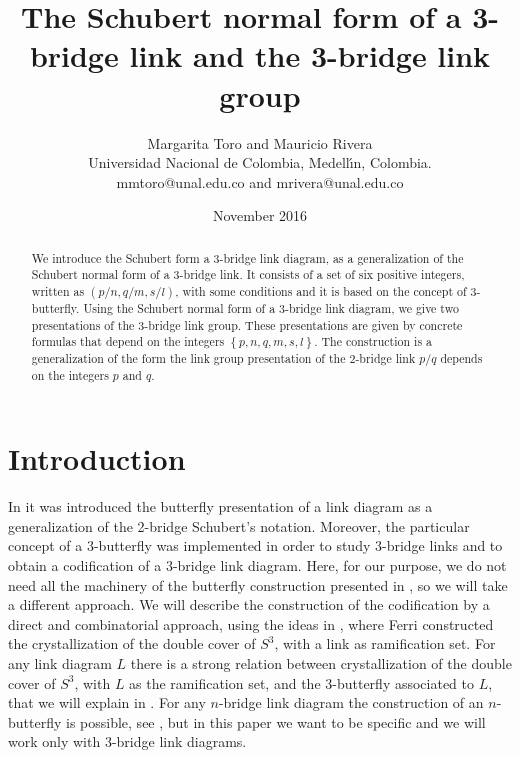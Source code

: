 \documentclass[12pt]{article}%
\begin{document}
\title{The Schubert normal form of a 3-bridge link and the 3-bridge link group}
\author{Margarita Toro and Mauricio Rivera\\Universidad Nacional de Colombia, Medell\'{\i}n, Colombia.\\mmtoro@unal.edu.co and mrivera@unal.edu.co}
\date{November 2016}
\maketitle

\begin{abstract}
We introduce the Schubert form a $3$-bridge link diagram, as a generalization
of the Schubert normal form of a $3$-bridge link. It consists of a set of six
positive integers, written as $\left(  p/n,q/m,s/l\right)  $, with some
conditions and it is based on the concept of $3$-butterfly. Using the Schubert
normal form of a $3$-bridge link diagram, we give two presentations of the
3-bridge link group. These presentations are given by concrete formulas that
depend on the integers $\left\{  p,n,q,m,s,l\right\}  .$ The construction is a
generalization of the form the link group presentation of the $2$-bridge link
$p/q$ depends on the integers $p$ and $q$.

\end{abstract}

\section{Introduction}

In \cite{HMTT4} it was introduced the butterfly presentation of a link diagram
as a generalization of the 2-bridge Schubert's notation. Moreover, the
particular concept of a $3$-butterfly was implemented in order to study
$3$-bridge links and to obtain a codification of a $3$-bridge link diagram.
Here, for our purpose, we do not need all the machinery of the butterfly
construction presented in \cite{HMTT1}, so we will take a different approach.
We will describe the construction of the codification by a direct and
combinatorial approach, using the ideas in \cite{Fe}, where Ferri constructed
the crystallization of the double cover of $S^{3}$, with a link as
ramification set. For any link diagram $L$ there is a strong relation between
crystallization of the double cover of $S^{3}$, with $L$ as the ramification
set, and the $3$-butterfly associated to $L$, that we will explain in
\cite{RiTo}. For any $n$-bridge link diagram the construction of an
$n$-butterfly is possible, see \cite{HMTT1}, but in this paper we want to be
specific and we will work only with $3$-bridge link diagrams.
\end{document}
